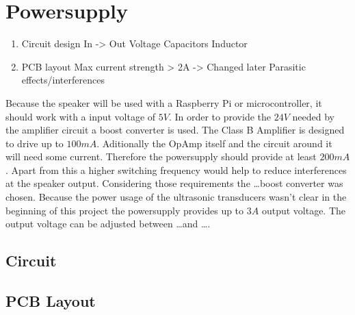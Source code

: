 \section{Powersupply}

\begin{enumerate}
  \item Circuit design
  \subitem In -> Out Voltage
  \subitem Capacitors
  \subitem Inductor
  \item PCB layout
  \subitem Max current strength
  \subsubitem > 2A -> Changed later
  \subitem Parasitic effects/interferences
\end{enumerate}

Because the speaker will be used with a Raspberry Pi or microcontroller, it should work with a input voltage of $5V$. In order to provide the $24V$ needed by the amplifier circuit a boost converter is used.\p
The Class B Amplifier is designed to drive up to $100mA$. Aditionally the OpAmp itself and the circuit around it will need some current. Therefore the powersupply should provide at least $200mA$. Apart from this a higher switching frequency would help to reduce interferences at the speaker output.\p
%
Considering those requirements the \dots boost converter was chosen. Because the power usage of the ultrasonic transducers wasn't clear in the beginning of this project the powersupply provides up to $3A$ output voltage. The output voltage can be adjusted between \dots and \dots.

\subsection{Circuit}


\subsection{PCB Layout}
